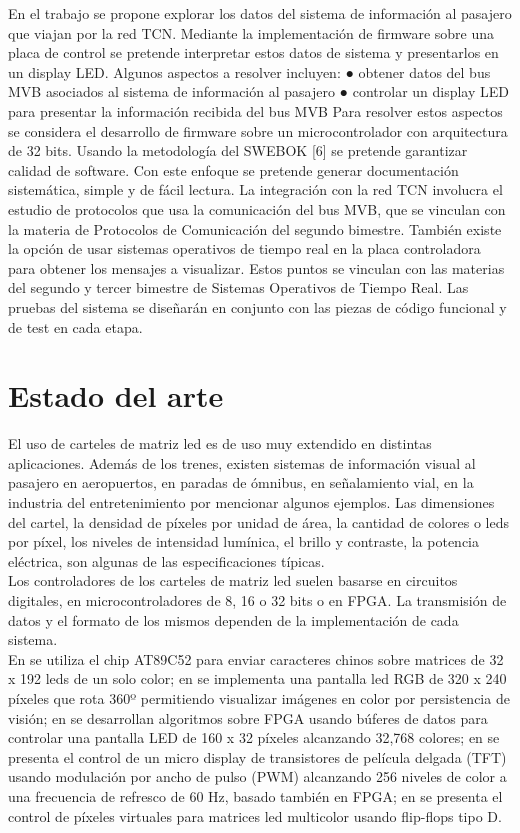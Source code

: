 En el trabajo se propone explorar los datos del sistema de información al pasajero que viajan por
la red TCN. Mediante la implementación de firmware sobre una placa de control se pretende
interpretar estos datos de sistema y presentarlos en un display LED. Algunos aspectos a resolver
incluyen:
● obtener datos del bus MVB asociados al sistema de información al pasajero
● controlar un display LED para presentar la información recibida del bus MVB
Para resolver estos aspectos se considera el desarrollo de firmware sobre un microcontrolador
con arquitectura de 32 bits. Usando la metodología del SWEBOK [6] se pretende garantizar
calidad de software. Con este enfoque se pretende generar documentación sistemática, simple y
de fácil lectura. La integración con la red TCN involucra el estudio de protocolos que usa la
comunicación del bus MVB, que se vinculan con la materia de Protocolos de Comunicación del
segundo bimestre. También existe la opción de usar sistemas operativos de tiempo real en la
placa controladora para obtener los mensajes a visualizar. Estos puntos se vinculan con las
materias del segundo y tercer bimestre de Sistemas Operativos de Tiempo Real. Las pruebas del
sistema se diseñarán en conjunto con las piezas de código funcional y de test en cada etapa.

\pagebreak
\section{Estado del arte}
El uso de carteles de matriz led es de uso muy extendido en distintas aplicaciones. Además de los trenes,  existen sistemas de información visual al pasajero en aeropuertos, en paradas de ómnibus, en señalamiento vial, en la industria del entretenimiento por mencionar algunos ejemplos. Las dimensiones del cartel, la densidad de píxeles por unidad de área, la cantidad de colores o leds por píxel, los niveles de intensidad lumínica, el brillo y contraste, la potencia eléctrica, son algunas de las especificaciones típicas.\\

 Los controladores de los carteles de matriz led suelen basarse en circuitos digitales, en microcontroladores de 8, 16 o 32 bits o en FPGA. La transmisión de datos y el formato de los mismos dependen de la implementación de cada sistema.  \\

En \cite{b1} se utiliza el chip AT89C52 para enviar caracteres chinos sobre matrices de 32 x 192 leds de un solo color; en \cite{b2} se implementa una pantalla led RGB de 320 x 240 píxeles que rota 360º permitiendo visualizar imágenes en color por persistencia de visión; en \cite{b3} se desarrollan algoritmos sobre FPGA usando búferes de datos para controlar una pantalla LED de 160 x 32 píxeles alcanzando 32,768 colores; en \cite{b4} se presenta el control de un micro display de transistores de película delgada (TFT) usando modulación por ancho de pulso (PWM) alcanzando 256 niveles de color a una frecuencia de refresco de 60 Hz, basado también en FPGA; en \cite{b5} se presenta el control de píxeles virtuales para matrices led multicolor usando flip-flops tipo D. \\

